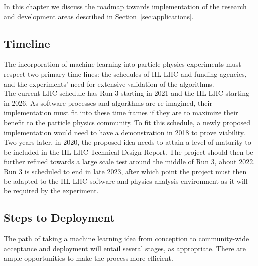 
In this chapter we discuss the roadmap towards implementation of the research and development areas described in Section~\ref{sec:applications}.

\subsection{Timeline}
The incorporation of machine learning into particle physics experiments must respect two primary time lines: the schedules of HL-LHC and funding agencies, and the experiments' need for extensive validation of the algorithms.\\

The current LHC schedule has Run 3 starting in 2021 and the HL-LHC starting in 2026. As software processes and algorithms are re-imagined, their implementation must fit into these time frames if they are to maximize their benefit to the particle physics community. To fit this schedule, a newly proposed implementation would need to have a demonstration in 2018 to prove viability. Two years later, in 2020, the proposed idea needs to attain a level of maturity to be included in the HL-LHC Technical Design Report. The project should then be further refined towards a large scale test around the middle of Run 3, about 2022. Run 3 is scheduled to end in late 2023, after which point the project must then be adapted to the HL-LHC software and physics analysis environment as it will be required by the experiment.
%

\subsection{Steps to Deployment}
The path of taking a machine learning idea from conception to community-wide acceptance and deployment will entail several stages, as appropriate. There are ample opportunities to make the process more efficient.

